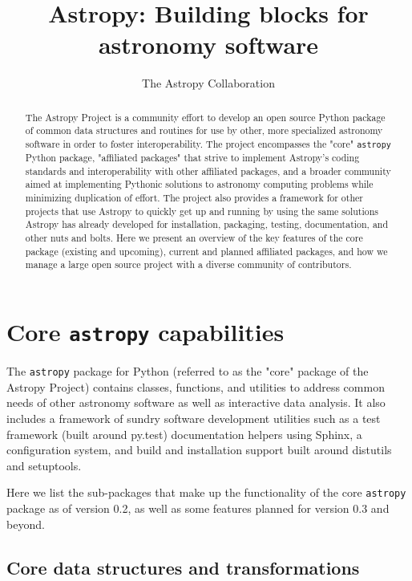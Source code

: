 \documentclass[11pt,twoside]{article}
\begin{document}
\title{Astropy: Building blocks for astronomy software}

\author{The Astropy Collaboration}

\begin{abstract}
The Astropy Project is a community effort to develop an open source Python
package of common data structures and routines for use by other, more
specialized astronomy software in order to foster interoperability.
The project encompasses the "core" \texttt{astropy} Python package, "affiliated
packages" that strive to implement Astropy's coding standards and
interoperability with other affiliated packages, and a broader community aimed
at implementing Pythonic solutions to astronomy computing problems while
minimizing duplication of effort.  The project also provides a framework for
other projects that use Astropy to quickly get up and running by using the same
solutions Astropy has already developed for installation, packaging, testing,
documentation, and other nuts and bolts.
Here we present an overview of the key features of the core package (existing
and upcoming), current and planned affiliated packages, and how we manage a
large open source project with a diverse community of contributors.
\end{abstract}

\section{Core \texttt{astropy} capabilities}

The \texttt{astropy} package for Python (referred to as the "core" package of
the Astropy Project) contains classes, functions, and utilities to address
common needs of other astronomy software as well as interactive data analysis.
It also includes a framework of sundry software development utilities such as a
test framework (built around py.test) documentation helpers using Sphinx, a
configuration system, and build and installation support built around distutils
and setuptools.

Here we list the sub-packages that make up the functionality of the core
\texttt{astropy} package as of version 0.2, as well as some features planned
for version 0.3 and beyond.

\subsection{Core data structures and transformations}

\end{document}
